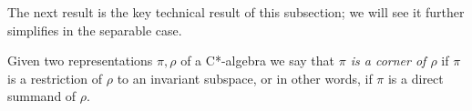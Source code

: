 \documentclass[11 pt, leqno, hidelinks]{amsart}%
\theoremstyle{plain}
\newtheorem{definition}[theorem]{Definition}
\numberwithin{equation}{section}
\begin{document}

The next result is the key technical result of this subsection; we will see it further simplifies in the separable case. %

Given two representations $\pi, \rho$ of a C*-algebra we say that \emph{$\pi$ is a corner of $\rho$} if $\pi$ is a restriction of $\rho$ to an invariant subspace, or in other words, if $\pi$ is a direct summand of $\rho$.
\end{document}
